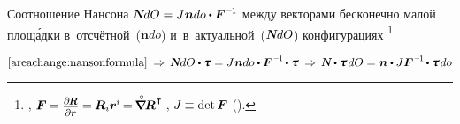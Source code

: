 \begin{otherlanguage}{russian}

Соотношение Нансона ${\mathboldN dO = J \hspace{.1ex} \bm{n} do \dotp \bm{F}^{\hspace{.1ex}\expminusone} \hspace{-0.1ex}}$ между векторами бесконечно малой площ\'{а}дки в~отсчётной~(${\bm{n} do}$) и~в~актуальной~(${\mathboldN dO}$) конфигурациях%
\footnote{,
${\bm{F} \hspace{-0.1ex}
= \scalebox{0.8}{$ \displaystyle \frac{\raisemath{-0.2em}{\partial \hspace{-0.15ex} \bm{R}}}{\partial \bm{r}} $}
= \hspace{-0.1ex} \bm{R}_i \bm{r}^{\hspace{-0.05ex}i} \hspace{-0.2ex}
= \hspace{-0.2ex} \boldnablacircled \hspace{-0.16ex} \bm{R}^{\hspace{.1ex}\T} \hspace{-0.2ex}}$\ru{\:---} , ${J \hspace{-0.1ex} \equiv \operatorname{det} \bm{F}\hspace{-0.12ex}}$\ru{\:---}  ().}

\nopagebreak\vspace{-0.12em}\begin{equation*}
\eqref{areachange:nansonformula}
\:\Rightarrow\,
\mathboldN dO \dotp \cauchystress
= J \hspace{.1ex} \bm{n} do \dotp \bm{F}^{\hspace{.1ex}\expminusone} \hspace{-0.2ex} \dotp \cauchystress
\:\Rightarrow\,
\mathboldN \dotp \cauchystress \hspace{.25ex} dO
= \hspace{.1ex} \bm{n} \dotp J \bm{F}^{\hspace{.1ex}\expminusone} \hspace{-0.2ex} \dotp \cauchystress \hspace{.2ex} do
\end{equation*}

\vspace{-0.2em} \noindent {}


\end{otherlanguage}

